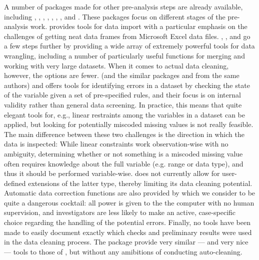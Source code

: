\documentclass[article,shortnames]{jss}
\begin{document}
A number of  packages made for other pre-analysis steps
are already available, including  \citep{janitor},
 \citep{assertive},  \citep{dplyr},
\citep{tidyr},  \citep{data.table},
 \citep{DataCombine}, 
\citep{validate}, and  \citep{assertr}. These packages
focus on different stages of the pre-analysis work.  
provides tools for data import with a particular emphasis on the
challenges of getting neat data frames from Microsoft Excel data
files. , ,  and
 go a few steps further by providing a wide array of
extremely powerful tools for data wrangling, including a number of
particularly useful functions for merging and working with very large
datasets. When it comes to actual data cleaning, however, the options
are fewer.   (and the similar packages 
\citep{editrules} and  \citep{deducorrect} from the
same authors) and  offers tools for identifying errors
in a dataset by checking the state of the variable given a set of
pre-specified rules, and their focus is on internal validity rather
than general data screening. In practice, this means that quite elegant
tools for, e.g., linear restraints among the variables in a dataset
can be applied, but looking for potentially miscoded missing values is
not really feasible. The main difference between these two challenges
is the direction in which the data is inspected: While linear
constraints work observation-wise with no ambiguity, determining
whether or not something is a miscoded missing value often requires
knowledge about the full variable (e.g. range or data type), and thus
it should be performed variable-wise.  does not
currently allow for user-defined extensions of the latter type,
thereby limiting its data cleaning potential.  Automatic data
correction functions are also provided by  which we
consider to be quite a dangerous cocktail: all power is given to the
the computer with no human supervision, and investigators are less
likely to make an active, case-specific choice regarding the handling
of the potential errors.  Finally, no tools have been made to easily
document exactly which checks and preliminary results were used in the
data cleaning process. The  package provide very similar
--- and very nice --- tools to those of , but without
any amibitions of conducting auto-cleaning.
\end{document}
